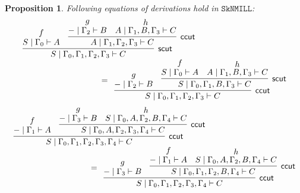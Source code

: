 \documentclass[sn-mathphys-num]{sn-jnl}%
\newcommand{\GG}{\Gamma}
\newcommand{\vd}{\vdash}
\newcommand{\SkNMILL}{$\mathtt{SkNMILL}$}
\newcommand{\mf}[1]{\mathsf{#1}}
\theoremstyle{thmstyleone}%
\newtheorem{proposition}[theorem]{Proposition}%
\theoremstyle{thmstyletwo}%
\theoremstyle{thmstylethree}%
\begin{document}
\begin{proposition}\label{eq:cut}
  Following equations of derivations hold in \SkNMILL\textnormal{:}
    \begin{displaymath}
      \begin{array}{l}
      \begin{array}{c}
        \infer[\mf{scut}]{S \mid \GG_0, \GG_1 , \GG_2 , \GG_3 \vd C}{
          \deduce{S \mid \GG_0 \vd A}{f}
          &
          \infer[\mf{ccut}]{A \mid \GG_1 , \GG_2 , \GG_3 \vd C}{
            \deduce{{-} \mid \GG_2 \vd B}{g}
            &
            \deduce{A \mid \GG_1 , B , \GG_3 \vd C}{h}
          }
        }
      \end{array}
      \\[10pt]
        \qquad \qquad \qquad \qquad \qquad  =
        \begin{array}{c}
          \infer[\mf{ccut}]{S \mid \GG_0, \GG_1 , \GG_2 , \GG_3 \vd C}{
          \deduce{{-} \mid \GG_2 \vd B}{g}
          &
          \infer[\mf{scut}]{S \mid \GG_0 , \GG_1 , B , \GG_3 \vd C}{
            \deduce{S \mid \GG_0 \vd A}{f}
            &
            \deduce{A \mid \GG_1 , B , \GG_3 \vd C}{h}
          }
        }
        \end{array}
      \end{array}
      \end{displaymath}
      \begin{displaymath}
      \begin{array}{l}
      \begin{array}{c}
        \infer[\mf{ccut}]{S \mid \GG_0 , \GG_1 , \GG_2 , \GG_3 , \GG_4 \vd C}{
          \deduce{{-} \mid \GG_1 \vd A}{f}
          &
          \infer[\mf{ccut}]{S \mid \GG_0 , A , \GG_2 , \GG_3 , \GG_4 \vd C}{
            \deduce{{-} \mid \GG_3 \vd B}{g}
            &
            \deduce{S \mid \GG_0 , A , \GG_2 , B , \GG_4 \vd C}{h}
          }
        }
      \end{array}
      \\[10pt]
      \qquad \qquad \qquad \qquad \qquad  =
      \begin{array}{c}
        \infer[\mf{ccut}]{S \mid \GG_0 , \GG_1 , \GG_2 , \GG_3 , \GG_4 \vd C}{
          \deduce{{-} \mid \GG_3 \vd B}{g}
          &
          \infer[\mf{ccut}]{S \mid \GG_0 , \GG_1 , \GG_2 , B , \GG_4 \vd C}{
            \deduce{{-} \mid \GG_1 \vd A}{f}
            &
            \deduce{S \mid \GG_0 , A , \GG_2 , B , \GG_4 \vd C}{h}
          }
        }
      \end{array}

\end{array}
\end{displaymath}
\end{proposition}
\end{document}
